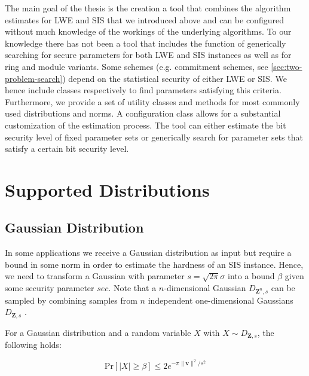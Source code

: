 The main goal of the thesis is the creation a tool that combines the algorithm estimates for LWE and SIS that we introduced above and can be configured without much knowledge of the workings of the underlying algorithms. To our knowledge there has not been a tool that includes the function of generically searching for secure parameters for both LWE and SIS instances as well as for ring and module variants. Some schemes (e.g. commitment schemes, see \cref{sec:two-problem-search}) depend on the statistical security of either LWE or SIS. We hence include classes respectively to find parameters satisfying this criteria. %
Furthermore, we provide a set of utility classes and methods for most commonly used distributions and norms.
A configuration class allows for a substantial customization of the estimation process.
The tool can either estimate the bit security level of fixed parameter sets or generically search for parameter sets that satisfy a certain bit security level.

\section{Supported Distributions} \label{sec:supported-distributions}%
\subsection{Gaussian Distribution}
In some applications we receive a Gaussian distribution as input but require a bound in some norm in order to estimate the hardness of an SIS instance. Hence, we need to transform a Gaussian with parameter $s  = \sqrt{2 \pi} \sigma$ into a bound $\beta$ given some security parameter $sec$. Note that a $n$-dimensional Gaussian $D_{\mathbf{Z}^n, s}$ can be sampled by combining samples from $n$ independent one-dimensional Gaussians $D_{\mathbf{Z}, s}$ \cite{GJS15}. %

For a Gaussian distribution and a random variable $X$ with $X \sim D_{\mathbf{Z}, s}$, the following holds: %

\begin{equation}
    \text{Pr}\left[ |X| \geq \beta \right] \leq 2 e^{-\pi \|\mathbf{v}\|^2/s^2}
\end{equation}

